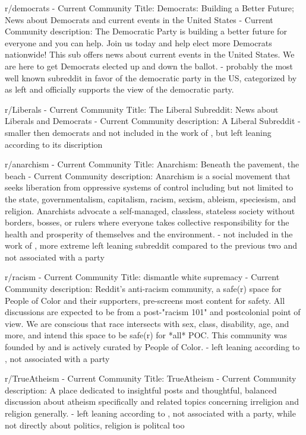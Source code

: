 

r/democrats
- Current Community Title: Democrats: Building a Better Future; News about Democrats and current events in the United States
- Current Community description: The Democratic Party is building a better future for everyone and you can help. Join us today and help elect more Democrats nationwide! This sub offers news about current events in the United States. We are here to get Democrats elected up and down the ballot.
- probably the most well known subreddit in favor of the democratic party in the US, categorized by \cite{waller2021quantifying} as left and officially supports the view of the democratic party. 

r/Liberals
- Current Community Title: The Liberal Subreddit: News about Liberals and Democrats
- Current Community description: A Liberal Subreddit
- smaller then democrats and not included in the work of \cite{waller2021quantifying}, but left leaning according to its discription

r/anarchism
- Current Community Title: Anarchism: Beneath the pavement, the beach
- Current Community description: Anarchism is a social movement that seeks liberation from oppressive systems of control including but not limited to the state, governmentalism, capitalism, racism, sexism, ableism, speciesism, and religion. Anarchists advocate a self-managed, classless, stateless society without borders, bosses, or rulers where everyone takes collective responsibility for the health and prosperity of themselves and the environment.
- not included in the work of \cite{waller2021quantifying}, more extreme left leaning subreddit compared to the previous two and not associated with a party

r/racism
- Current Community Title: dismantle white supremacy
- Current Community description: Reddit's anti-racism community, a safe(r) space for People of Color and their supporters, pre-screens most content for safety. All discussions are expected to be from a post-"racism 101" and postcolonial point of view. We are conscious that race intersects with sex, class, disability, age, and more, and intend this space to be safe(r) for *all* POC. This community was founded by and is actively curated by People of Color.
- left leaning according to \cite{waller2021quantifying}, not associated with a party 

r/TrueAtheism
- Current Community Title: TrueAtheism
- Current Community description: A place dedicated to insightful posts and thoughtful, balanced discussion about atheism specifically and related topics concerning irreligion and religion generally.
- left leaning according to \cite{waller2021quantifying}, not associated with a party, while not directly about politics, religion is politcal too \cite{potz2020political}\cite{perry1999religion} \cite{langsaether2019religious} \cite{madrid2022relevance}


